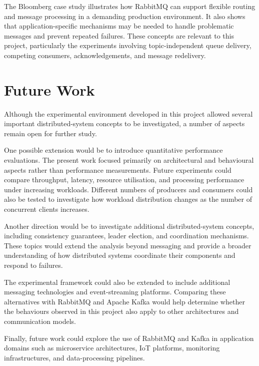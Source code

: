 \documentclass{scrartcl}
\begin{document}
The Bloomberg case study illustrates how RabbitMQ can support flexible routing and message processing in a demanding production environment. It also shows that application-specific mechanisms may be needed to handle problematic messages and prevent repeated failures. These concepts are relevant to this project, particularly the experiments involving topic-independent queue delivery, competing consumers, acknowledgements, and message redelivery. 

\section{Future Work}

Although the experimental environment developed in this project allowed several important distributed-system concepts to be investigated, a number of aspects remain open for further study.

One possible extension would be to introduce quantitative performance evaluations. The present work focused primarily on architectural and behavioural aspects rather than performance measurements. Future experiments could compare throughput, latency, resource utilisation, and processing performance under increasing workloads. Different numbers of producers and consumers could also be tested to investigate how workload distribution changes as the number of concurrent clients increases.

Another direction would be to investigate additional distributed-system concepts, including consistency guarantees, leader election, and coordination mechanisms. These topics would extend the analysis beyond messaging and provide a broader understanding of how distributed systems coordinate their components and respond to failures.

The experimental framework could also be extended to include additional messaging technologies and event-streaming platforms. Comparing these alternatives with RabbitMQ and Apache Kafka would help determine whether the behaviours observed in this project also apply to other architectures and communication models.

Finally, future work could explore the use of RabbitMQ and Kafka in application domains such as microservice architectures, IoT platforms, monitoring infrastructures, and data-processing pipelines. 
\end{document}
